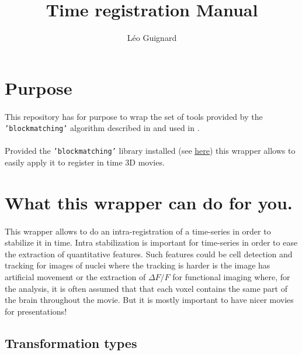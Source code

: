 \documentclass[10pt,a4paper]{article}
\author{L\'eo Guignard}
\title{Time registration Manual}
\newcommand{\option}[1]{{\texttt{'#1'}}}
\begin{document}
\maketitle
\tableofcontents
\clearpage
\section{Purpose}
\paragraph{}This repository has for purpose to wrap the set of tools provided by the \option{blockmatching} algorithm described in \citep{Ourselin:2000aa} and used in \citep{McDole:2018aa,Guignard:2017aa,Guignard:2014aa}.
\paragraph{}Provided the \option{blockmatching} library installed (see \href{https://gitlab.inria.fr/greg/Klab-BlockMatching}{\underline{here}}) this wrapper allows to easily apply it to register in time 3D movies.
\section{What this wrapper can do for you.}
\paragraph{}This wrapper allows to do an intra-registration of a time-series in order to stabilize it in time. Intra stabilization is important for time-series in order to ease the extraction of quantitative features. Such features could be cell detection and tracking for images of nuclei where the tracking is harder is the image has artificial movement or the extraction of $\Delta F/F$ for functional imaging where, for the analysis, it is often assumed that that each voxel contains the same part of the brain throughout the movie. But it is mostly important to have nicer movies for presentations!
\subsection{Transformation types}
\end{document}
